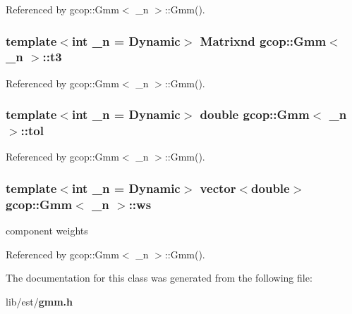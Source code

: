 \-Referenced by gcop\-::\-Gmm$<$ \-\_\-n $>$\-::\-Gmm().

\subsubsection[{t3}]{\setlength{\rightskip}{0pt plus 5cm}template$<$int \-\_\-n = \-Dynamic$>$ {\bf \-Matrixnd} {\bf gcop\-::\-Gmm}$<$ \-\_\-n $>$\-::{\bf t3}\hspace{0.3cm}{\ttfamily  [protected]}}\label{classgcop_1_1Gmm_ae36a5ca59d23e781bcc0e66110fbb53e}


\-Referenced by gcop\-::\-Gmm$<$ \-\_\-n $>$\-::\-Gmm().

\subsubsection[{tol}]{\setlength{\rightskip}{0pt plus 5cm}template$<$int \-\_\-n = \-Dynamic$>$ double {\bf gcop\-::\-Gmm}$<$ \-\_\-n $>$\-::{\bf tol}}\label{classgcop_1_1Gmm_ac141354e9389e078574cfb11b52e4e6d}


\-Referenced by gcop\-::\-Gmm$<$ \-\_\-n $>$\-::\-Gmm().

\subsubsection[{ws}]{\setlength{\rightskip}{0pt plus 5cm}template$<$int \-\_\-n = \-Dynamic$>$ vector$<$double$>$ {\bf gcop\-::\-Gmm}$<$ \-\_\-n $>$\-::{\bf ws}}\label{classgcop_1_1Gmm_aba03bddba16d5f8a61148ede9c3409df}


component weights 



\-Referenced by gcop\-::\-Gmm$<$ \-\_\-n $>$\-::\-Gmm().



\-The documentation for this class was generated from the following file\-:\begin{DoxyCompactItemize}
\item 
lib/est/{\bf gmm.\-h}\end{DoxyCompactItemize}
